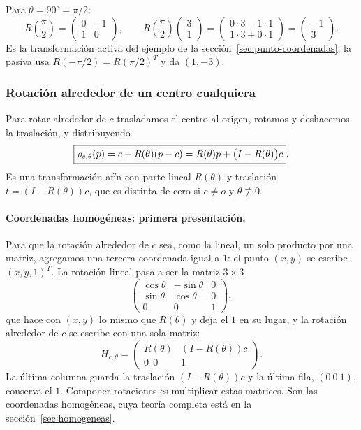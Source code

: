 \begin{ejemplo}
Para \(\theta=90^\circ=\pi/2\):
\[
R\left(\frac{\pi}{2}\right)=
\begin{pmatrix}0&-1\\1&0\end{pmatrix},
\qquad
R\left(\frac{\pi}{2}\right)\begin{pmatrix}3\\1\end{pmatrix}
=\begin{pmatrix}0\cdot3-1\cdot1\\1\cdot3+0\cdot1\end{pmatrix}
=\begin{pmatrix}-1\\3\end{pmatrix}.
\]
Es la transformación activa del ejemplo de la sección~\ref{sec:punto-coordenadas}; la pasiva
usa \(R(-\pi/2)=R(\pi/2)^T\) y da \((1,-3)\).
\end{ejemplo}

\subsubsection{Rotación alrededor de un centro cualquiera}

Para rotar alrededor de \(c\) trasladamos el centro al origen, rotamos y deshacemos la
traslación, y distribuyendo
\[
  \boxed{\rho_{c,\theta}(p)=c+R(\theta)(p-c)=R(\theta)p+\bigl(I-R(\theta)\bigr)c}.
\]
Es una
transformación afín con parte lineal \(R(\theta)\) y traslación \(t=(I-R(\theta))c\), que es
distinta de cero si \(c\neq o\) y \(\theta\not\equiv0\).

\paragraph{Coordenadas homogéneas: primera presentación.}\label{sec:homogeneas-rotacion}
Para que la rotación alrededor de \(c\) sea, como la lineal, un solo producto por una matriz,
agregamos una tercera coordenada igual a \(1\): el punto \((x,y)\) se escribe \((x,y,1)^T\).
La rotación lineal pasa a ser la matriz \(3\times3\)
\[
\begin{pmatrix}
\cos\theta&-\sin\theta&0\\
\sin\theta&\cos\theta&0\\
0&0&1
\end{pmatrix},
\]
que hace con \((x,y)\) lo mismo que \(R(\theta)\) y deja el \(1\) en su lugar, y la rotación
alrededor de \(c\) se escribe con una sola matriz:
\[
H_{c,\theta}=
\begin{pmatrix}
R(\theta) & (I-R(\theta))c\\
0\ \ 0 & 1
\end{pmatrix}.
\]
La última columna guarda la traslación \((I-R(\theta))c\) y la última fila, \((0\ 0\ 1)\),
conserva el \(1\). Componer rotaciones es multiplicar estas matrices. Son las coordenadas
homogéneas, cuya teoría completa está en la sección~\ref{sec:homogeneas}.

